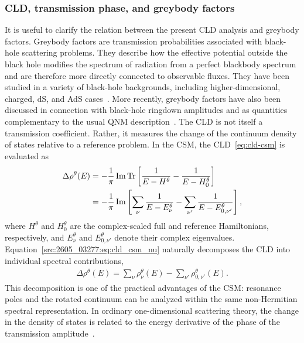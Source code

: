 \subsubsection{CLD, transmission phase, and greybody factors}
\label{src:2605_03277:sec:discussion-greybody}
It is useful to clarify the relation between the present CLD analysis and
greybody factors.
Greybody factors are transmission probabilities associated with black-hole
scattering problems.
They describe how the effective potential outside the black hole modifies the
spectrum of radiation from a perfect blackbody spectrum and are therefore
more directly connected to observable fluxes.
They have been studied in a variety of black-hole backgrounds, including
higher-dimensional, charged, dS, and AdS cases~\cite{Harmark:2007jy}.
More recently, greybody factors have also been discussed in connection with
black-hole ringdown amplitudes and as quantities complementary to the usual
QNM description~\cite{Oshita:2023cjz,Konoplya:2024lir}.
The CLD is not itself a transmission coefficient.
Rather, it measures the change of the continuum density of states relative to
a reference problem.
In the CSM, the CLD~\eqref{eq:cld-csm} is evaluated as
\begin{align}
    \Delta \rho^\theta(E)
    &=
    -\frac{1}{\pi}
    \operatorname{Im}
    \operatorname{Tr}
    \left[
        \frac{1}{E-H^\theta}
        -
        \frac{1}{E-H_0^\theta}
    \right]
    \notag\\
    &=
    -\frac{1}{\pi}
    \operatorname{Im}
    \left[
        \sum_\nu \frac{1}{E-E^\theta_\nu}
        -
        \sum_{\nu'} \frac{1}{E-E^\theta_{0,\nu'}}
    \right],
    \label{src:2605_03277:eq:cld_csm_nu}
\end{align}
where $H^\theta$ and $H_0^\theta$ are the complex-scaled full and reference
Hamiltonians, respectively, and
$E^\theta_\nu$ and $E^\theta_{0,\nu'}$ denote their complex eigenvalues.
Equation~\eqref{src:2605_03277:eq:cld_csm_nu} naturally decomposes the CLD into individual
spectral contributions,
\begin{align}
    \Delta\rho^\theta(E)
    =
    \sum_\nu \rho^\theta_\nu(E)
    -
    \sum_{\nu'} \rho^\theta_{0,\nu'}(E).
\end{align}
This decomposition is one of the practical advantages of the CSM:
resonance poles and the rotated continuum can be analyzed within the same
non-Hermitian spectral representation.
In ordinary one-dimensional scattering theory, the change in the density of
states is related to the energy derivative of the phase of the transmission
amplitude~\cite{Avishai:1985}.
